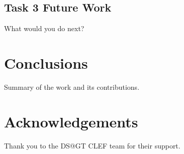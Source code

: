 \documentclass[]{style/ceurart}
\begin{document}
\subsection{Task 3 Future Work}

What would you do next?


\section{Conclusions}

Summary of the work and its contributions.

\section*{Acknowledgements}

Thank you to the DS@GT CLEF team for their support.



\end{document}
